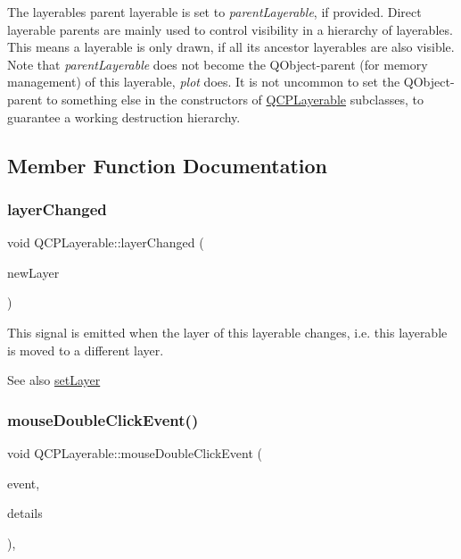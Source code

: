 The layerable\textquotesingle{}s parent layerable is set to {\itshape parent\+Layerable}, if provided. Direct layerable parents are mainly used to control visibility in a hierarchy of layerables. This means a layerable is only drawn, if all its ancestor layerables are also visible. Note that {\itshape parent\+Layerable} does not become the Q\+Object-\/parent (for memory management) of this layerable, {\itshape plot} does. It is not uncommon to set the Q\+Object-\/parent to something else in the constructors of \hyperlink{classQCPLayerable}{Q\+C\+P\+Layerable} subclasses, to guarantee a working destruction hierarchy. 

\subsection{Member Function Documentation}
\mbox{\label{classQCPLayerable_abbf8657cedea73ac1c3499b521c90eba}} 
\subsubsection{\texorpdfstring{layer\+Changed}{layerChanged}}
{\footnotesize\ttfamily void Q\+C\+P\+Layerable\+::layer\+Changed (\begin{DoxyParamCaption}\item[{\hyperlink{classQCPLayer}{Q\+C\+P\+Layer} $\ast$}]{new\+Layer }\end{DoxyParamCaption})\hspace{0.3cm}{\ttfamily [signal]}}

This signal is emitted when the layer of this layerable changes, i.\+e. this layerable is moved to a different layer.

\begin{DoxySeeAlso}{See also}
\hyperlink{classQCPLayerable_ab0d0da6d2de45a118886d2c8e16d5a54}{set\+Layer} 
\end{DoxySeeAlso}
\mbox{\label{classQCPLayerable_a4171e2e823aca242dd0279f00ed2de81}} 
\subsubsection{\texorpdfstring{mouse\+Double\+Click\+Event()}{mouseDoubleClickEvent()}}
{\footnotesize\ttfamily void Q\+C\+P\+Layerable\+::mouse\+Double\+Click\+Event (\begin{DoxyParamCaption}\item[{Q\+Mouse\+Event $\ast$}]{event,  }\item[{const Q\+Variant \&}]{details }\end{DoxyParamCaption})\hspace{0.3cm}{\ttfamily [protected]}, {\ttfamily [virtual]}}

